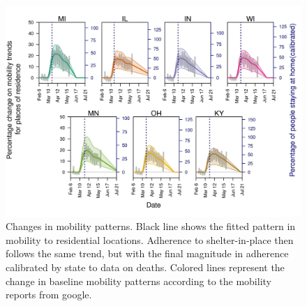 \documentclass[11pt]{article}
\begin{document}
\begin{figure}[hb!]
\centering
\includegraphics[width=\textwidth]{../figures/report_figure_shelter_patterns.jpeg} 
\caption{\label{fig_google_shelter} Changes in mobility patterns. Black line shows the fitted pattern in mobility to residential locations. Adherence to shelter-in-place then follows the same trend, but with the final magnitude in adherence calibrated by state to data on deaths. Colored lines represent the change in baseline mobility patterns according to the mobility reports from google.}
\end{figure}

\end{document}
